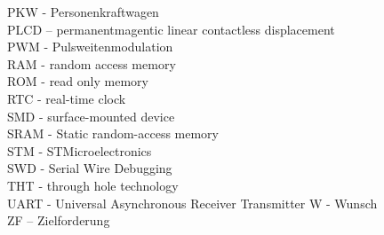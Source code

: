 PKW - Personenkraftwagen\\
PLCD – permanentmagentic linear contactless displacement\\
PWM - Pulsweitenmodulation\\ 
RAM - random access memory\\
ROM - read only memory\\
RTC - real-time clock\\
SMD - surface-mounted device\\
SRAM - Static random-access memory\\
STM - STMicroelectronics\\
SWD - Serial Wire Debugging\\
THT - through hole technology\\
UART - Universal Asynchronous Receiver Transmitter
W - Wunsch\\
ZF – Zielforderung\\
